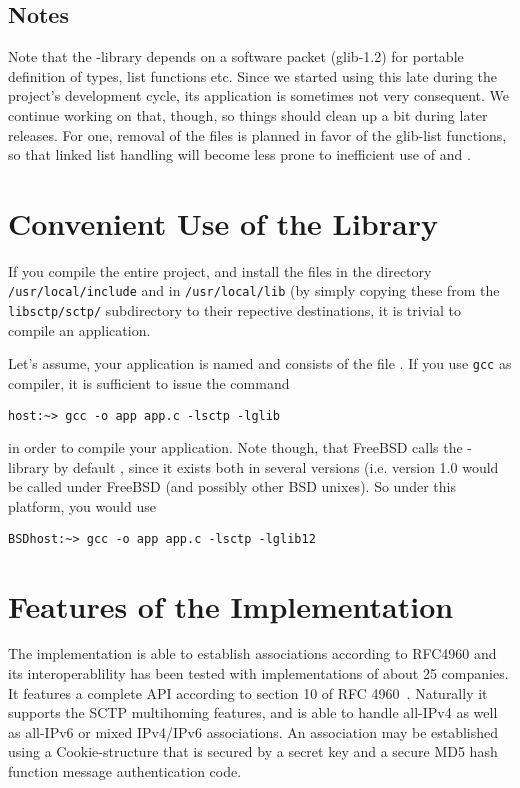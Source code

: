 \documentclass[10pt]{article}
\newcommand{\lib}{ \libname{libsctp}-library }
\begin{document}
\subsection{Notes}
Note that the \lib depends on a software packet (glib-1.2) for portable definition of
types, list functions etc.
Since we started using this late during the
project's development cycle, its application is sometimes not very 
consequent. We continue working on that, though, so things should clean
up a bit during later releases. For one, removal of the 
files is planned in favor of the glib-list functions,
so that linked list handling will become less prone
to inefficient use of  and .

\section{Convenient Use of the Library}
If you compile the entire project, and install the files
 in the directory \texttt{/usr/local/include}
and  in \texttt{/usr/local/lib} (by simply
copying these from the \texttt{libsctp/sctp/} subdirectory
to their repective destinations, it is trivial to compile
an application.

Let's assume, your application is named 
and consists of the file . If you use \texttt{gcc} as
compiler, it is sufficient to issue the command
\begin{verbatim}
host:~> gcc -o app app.c -lsctp -lglib
\end{verbatim}
in order to compile your application. Note though, that FreeBSD calls
the -library by default , since it
exists both in several versions (i.e.   version 1.0 would
be called  under FreeBSD (and possibly other
BSD unixes). So under this platform, you would use
\begin{verbatim}
BSDhost:~> gcc -o app app.c -lsctp -lglib12
\end{verbatim}


\section{Features of the Implementation}
The implementation is able to establish associations according to RFC4960 and
its interoperablility has been tested with implementations of about 25 companies.
It features a complete API according to section 10 of RFC 4960~\cite{RFC4960}.
Naturally it supports the SCTP multihoming features, and is able to handle
all-IPv4  as well as all-IPv6 or mixed IPv4/IPv6 associations.
An association may be established using a Cookie-structure that is secured
by a secret key and a secure MD5 hash function message authentication
code.
\end{document}
